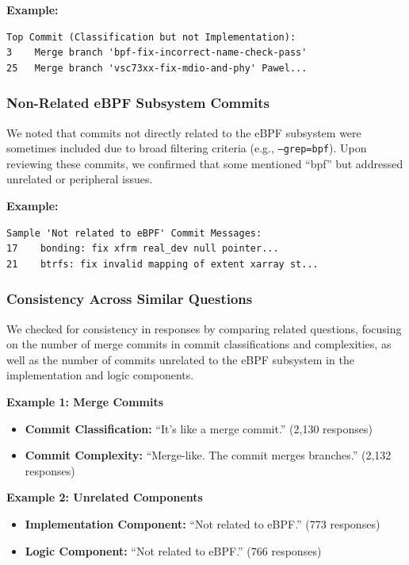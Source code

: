 \textbf{Example:}
\begin{verbatim}
Top Commit (Classification but not Implementation):
3    Merge branch 'bpf-fix-incorrect-name-check-pass'
25   Merge branch 'vsc73xx-fix-mdio-and-phy' Pawel...
\end{verbatim}

\subsubsection{Non-Related eBPF Subsystem Commits}

We noted that commits not directly related to the eBPF subsystem were sometimes included due to broad filtering criteria (e.g., \texttt{--grep=bpf}). Upon reviewing these commits, we confirmed that some mentioned ``bpf'' but addressed unrelated or peripheral issues.

\textbf{Example:}
\begin{verbatim}
Sample 'Not related to eBPF' Commit Messages:
17    bonding: fix xfrm real_dev null pointer...
21    btrfs: fix invalid mapping of extent xarray st...
\end{verbatim}

\subsubsection{Consistency Across Similar Questions}

We checked for consistency in responses by comparing related questions, focusing on the number of merge commits in commit classifications and complexities, as well as the number of commits unrelated to the eBPF subsystem in the implementation and logic components.

\textbf{Example 1: Merge Commits}
\begin{itemize}
    \item \textbf{Commit Classification:} ``It's like a merge commit.'' (2,130 responses)
    \item \textbf{Commit Complexity:} ``Merge-like. The commit merges branches.'' (2,132 responses)
\end{itemize}

\textbf{Example 2: Unrelated Components}
\begin{itemize}
    \item \textbf{Implementation Component:} ``Not related to eBPF.'' (773 responses)
    \item \textbf{Logic Component:} ``Not related to eBPF.'' (766 responses)
\end{itemize}

